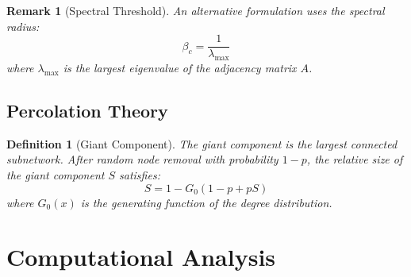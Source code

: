 \documentclass[a4paper, 11pt]{article}
\newtheorem{definition}{Definition}[section]
\newtheorem{remark}{Remark}[section]
\begin{document}
\begin{remark}[Spectral Threshold]
An alternative formulation uses the spectral radius:
\begin{equation}
\beta_c = \frac{1}{\lambda_{\max}}
\end{equation}
where $\lambda_{\max}$ is the largest eigenvalue of the adjacency matrix $A$.
\end{remark}

\subsection{Percolation Theory}

\begin{definition}[Giant Component]
The giant component is the largest connected subnetwork. After random node removal
with probability $1-p$, the relative size of the giant component $S$ satisfies:
\begin{equation}
S = 1 - G_0(1 - p + pS)
\end{equation}
where $G_0(x)$ is the generating function of the degree distribution.
\end{definition}

\section{Computational Analysis}
\end{document}

